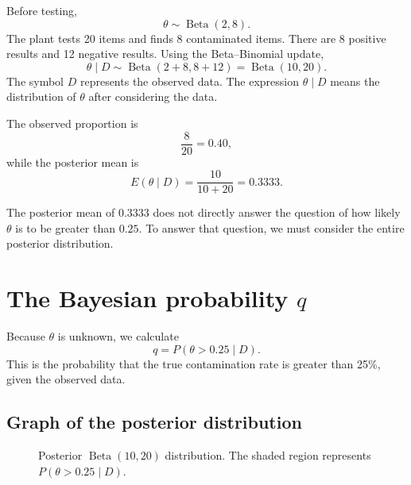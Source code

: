 \documentclass[11pt,letter]{article}
\begin{document}
Before testing,
\[
\theta\sim\operatorname{Beta}(2,8).
\]
The plant tests 20 items and finds 8 contaminated items. There are 8 positive
results and 12 negative results. Using the Beta--Binomial update,
\[
\theta\mid D
\sim\operatorname{Beta}(2+8,8+12)
=\operatorname{Beta}(10,20).
\]
The symbol $D$ represents the observed data. The expression $\theta\mid D$
means the distribution of $\theta$ after considering the data.

The observed proportion is
\[
\frac{8}{20}=0.40,
\]
while the posterior mean is
\[
E(\theta\mid D)=\frac{10}{10+20}=0.3333.
\]

\begin{atencao}
The posterior mean of $0.3333$ does not directly answer the question of how
likely $\theta$ is to be greater than $0.25$. To answer that question, we must
consider the entire posterior distribution.
\end{atencao}

\section{The Bayesian probability $q$}

Because $\theta$ is unknown, we calculate
\[
q=P(\theta>0.25\mid D).
\]
This is the probability that the true contamination rate is greater than 25\%,
given the observed data.
\subsection{Graph of the posterior distribution}

\begin{figure}[ht]
\centering
{}
\caption{Posterior $\operatorname{Beta}(10,20)$ distribution. The shaded
region represents $P(\theta>0.25\mid D)$.}
\end{figure}
\end{document}
